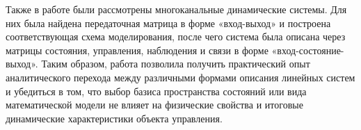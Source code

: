 \documentclass[a4paper, 12pt]{article}
\begin{document}
Также в работе были рассмотрены многоканальные динамические системы. Для них была найдена передаточная матрица в форме «вход-выход» и построена соответствующая схема моделирования, после чего система была описана через матрицы состояния, управления, наблюдения и связи в форме «вход-состояние-выход». Таким образом, работа позволила получить практический опыт аналитического перехода между различными формами описания линейных систем и убедиться в том, что выбор базиса пространства состояний или вида математической модели не влияет на физические свойства и итоговые динамические характеристики объекта управления.
\end{document}
